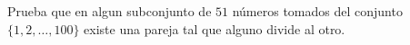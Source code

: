 \begin{problem}
    Prueba que en algun subconjunto de $51$ n\'umeros tomados
    del conjunto $\{1,2, \ldots, 100\}$ existe una pareja tal
    que alguno divide al otro. 
    \label{112CP156}
\end{problem}